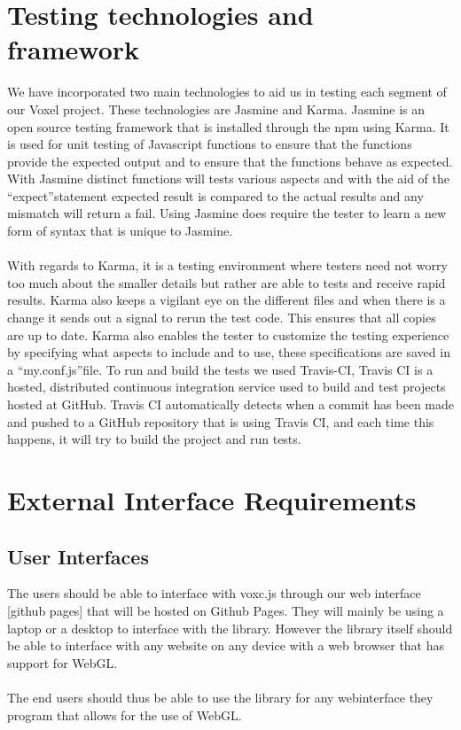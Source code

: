 \documentclass[english]{article}
\begin{document}
	\section{Testing technologies and framework}
We have incorporated two main technologies to aid us in testing each segment of our Voxel project. These technologies are Jasmine and Karma. Jasmine is an open source testing framework that is installed through the npm using Karma. It is used for unit testing of Javascript functions to ensure that the functions provide the expected output and to ensure that the functions behave as expected. With Jasmine distinct functions will tests various aspects and with the aid of the \textquotedblleft expect\textquotedblright \space statement expected result is compared to the actual results and any mismatch will return a fail. Using Jasmine does require the tester to learn a new form of syntax that is unique to Jasmine.\\\\
With regards to Karma, it is a testing environment where testers need not worry too much about the smaller details but rather are able to tests and receive rapid results. Karma also keeps a vigilant eye on the different files and when there is a change it sends out a signal to rerun the test code. This ensures that all copies are up to date. Karma also enables the tester to customize the testing experience by specifying what aspects to include and to use, these specifications are saved in a \textquotedblleft my.conf.js\textquotedblright \space file. To run and build the tests we used Travis-CI, Travis CI is a hosted, distributed continuous integration service used to build and test projects hosted at GitHub. Travis CI automatically detects when a commit has been made and pushed to a GitHub repository that is using Travis CI, and each time this happens, it will try to build the project and run tests.

	
	\section{External Interface Requirements}
	
		\subsection{User Interfaces}
		The users should be able to interface with voxc.js through our web interface [github pages] that will be hosted on Github Pages. They will mainly be using a laptop or a desktop to interface with the library. However the library itself should be able to interface with any website on any device with a web browser that has support for WebGL.
		\\\\
		The end users should thus be able to use the library for any webinterface they program that allows for the use of WebGL.
		
\end{document}
